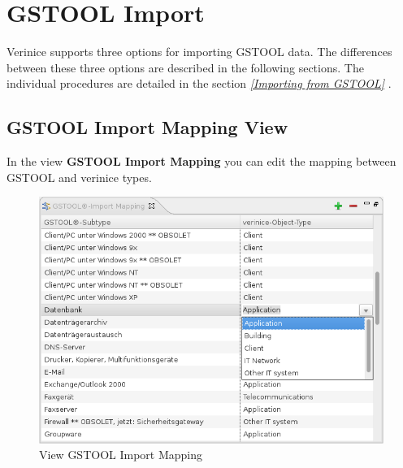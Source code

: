 \documentclass[a4paper,10pt]{book}
\begin{document}
\section{GSTOOL Import} \label{GSTOOL Import}
Verinice supports three options for importing \textsc{GSTOOL} data. The differences between these three
options are described in the following sections. The individual procedures are detailed in the section
{\em \ref{Importing from GSTOOL} }.

\subsection{GSTOOL Import Mapping View} \label{GSTOOL Import Mapping View}
In the view \textbf{GSTOOL Import Mapping} you can edit the mapping between GSTOOL and verinice types.
\begin{figure}[htb!]
  \centering
  \includegraphics[scale=.7]{Screenshot/gstool-import-mapping-view.png}
  \caption{\label{View GSTOOL Import Mapping View} View GSTOOL Import Mapping}
\end{figure}
\end{document}
